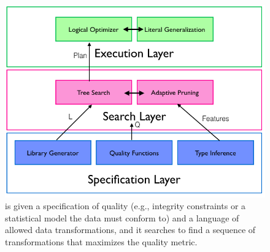\begin{figure}[t]
\centering
 \includegraphics[width=\columnwidth]{figures/alphacleanarch.png}
 \caption{ \sys is given a specification of quality (e.g., integrity constraints or a statistical model the data must conform to) and a language  of  allowed  data  transformations,  and  it  searches  to find a sequence of transformations that maximizes the quality metric. \label{fig:arch} }
\end{figure}


